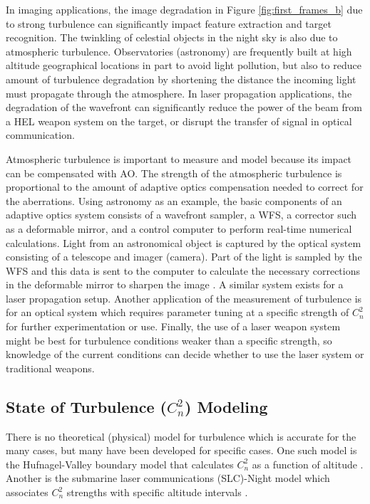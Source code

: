 In imaging applications, the image degradation in Figure \ref{fig:first_frames_b} due to strong turbulence can significantly impact feature extraction and target recognition. The twinkling of celestial objects in the night sky is also due to atmospheric turbulence. Observatories (astronomy) are frequently built at high altitude geographical locations in part to avoid light pollution, but also to reduce amount of turbulence degradation by shortening the distance the incoming light must propagate through the atmosphere. In laser propagation applications, the degradation of the wavefront can significantly reduce the power of the beam from a \ac{HEL} weapon system on the target, or disrupt the transfer of signal in optical communication.

Atmospheric turbulence is important to measure and model because its impact can be compensated with \ac{AO}. The strength of the atmospheric turbulence is proportional to the amount of adaptive optics compensation needed to correct for the aberrations. Using astronomy as an example, the basic components of an adaptive optics system consists of a wavefront sampler, a \ac{WFS}, a corrector such as a deformable mirror, and a control computer to perform real-time numerical calculations. Light from an astronomical object is captured by the optical system consisting of a telescope and imager (camera). Part of the light is sampled by the \ac{WFS} and this data is sent to the computer to calculate the necessary corrections in the deformable mirror to sharpen the image \cite{tyson2011principles}. A similar system exists for a laser propagation setup. Another application of the measurement of turbulence is for an optical system which requires parameter tuning at a specific strength of $C_{n}^{2}$ for further experimentation or use. Finally, the use of a laser weapon system might be best for turbulence conditions weaker than a specific strength, so knowledge of the current conditions can decide whether to use the laser system or traditional weapons.

\subsection{State of Turbulence ($C_{n}^{2}$) Modeling}
There is no theoretical (physical) model for turbulence which is accurate for the many cases, but many have been developed for specific cases. One such model is the Hufnagel-Valley boundary model that calculates $C_{n}^{2}$ as a function of altitude \cite{Valley:80}. Another is the submarine laser communications (SLC)-Night model which associates $C_{n}^{2}$ strengths with specific altitude intervals \cite{tyson2011principles}.

